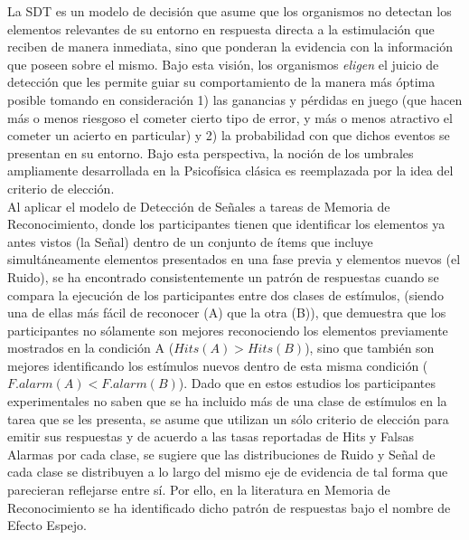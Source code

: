 La SDT es un modelo de decisión que asume que los organismos no detectan los elementos relevantes de su entorno en respuesta directa a la estimulación que reciben de manera inmediata, sino que ponderan la evidencia con la información que poseen sobre el mismo. Bajo esta visión, los organismos \textit{eligen} el juicio de detección que les permite guiar su comportamiento de la manera más óptima posible tomando en consideración 1) las ganancias y pérdidas en juego (que hacen más o menos riesgoso el cometer cierto tipo de error, y más o menos atractivo el cometer un acierto en particular) y 2) la probabilidad con que dichos eventos se presentan en su entorno. Bajo esta perspectiva, la noción de los umbrales ampliamente desarrollada en la Psicofísica clásica es reemplazada por la idea del criterio de elección.\\ 

Al aplicar el modelo de Detección de Señales a tareas de Memoria de Reconocimiento, donde los participantes tienen que identificar los elementos ya antes vistos (la Señal) dentro de un conjunto de ítems que incluye simultáneamente elementos presentados en una fase previa y elementos nuevos (el Ruido), se ha encontrado consistentemente un patrón de respuestas cuando se compara la ejecución de los participantes entre dos clases de estímulos, (siendo una de ellas más fácil de reconocer (A) que la otra (B)), que demuestra que los participantes no sólamente son mejores reconociendo los elementos previamente mostrados en la condición A ($Hits(A)>Hits(B)$), sino que también son mejores identificando los estímulos nuevos dentro de esta misma condición ($F.alarm(A)<F.alarm(B)$). Dado que en estos estudios los participantes experimentales no saben que se ha incluido más de una clase de estímulos en la tarea que se les presenta, se asume que utilizan un sólo criterio de elección para emitir sus respuestas y de acuerdo a las tasas reportadas de Hits y Falsas Alarmas por cada clase, se sugiere que las distribuciones de Ruido y Señal de cada clase se distribuyen a lo largo del mismo eje de evidencia de tal forma que parecieran reflejarse entre sí. Por ello, en la literatura en Memoria de Reconocimiento se ha identificado dicho patrón de respuestas bajo el nombre de Efecto Espejo.\\

